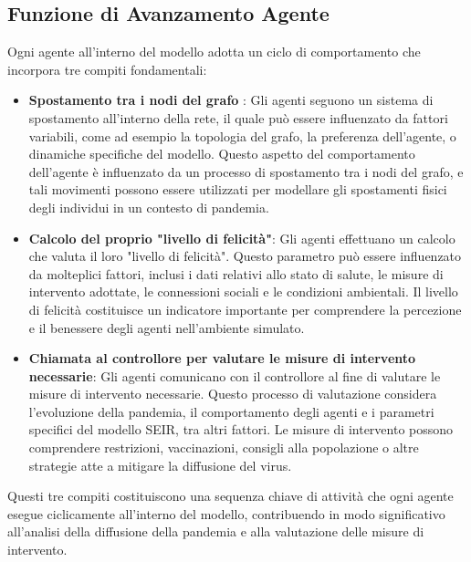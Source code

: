 \newpage

\subsection{Funzione di Avanzamento Agente}

Ogni agente all'interno del modello adotta un ciclo di comportamento che 
incorpora tre compiti fondamentali:

\begin{itemize}
	\item \textbf{Spostamento tra i nodi del grafo} \cite{Ding2021}: 
	Gli agenti seguono un sistema di spostamento all'interno della rete, 
	il quale può essere influenzato da fattori variabili, 
	come ad esempio la topologia del grafo, la preferenza dell'agente, 
	o dinamiche specifiche del modello. Questo aspetto del 
	comportamento dell'agente è influenzato da un processo di 
	spostamento tra i nodi del grafo, e tali movimenti possono essere 
	utilizzati per modellare gli spostamenti fisici degli individui in 
	un contesto di pandemia.
	\item \textbf{Calcolo del proprio "livello di felicità"}: Gli agenti 
	effettuano un calcolo che valuta il loro "livello di felicità". 
	Questo parametro può essere influenzato da molteplici fattori, 
	inclusi i dati relativi allo stato di salute, le misure di 
	intervento adottate, le connessioni sociali e le condizioni 
	ambientali. Il livello di felicità costituisce un indicatore 
	importante per comprendere la percezione e il benessere degli 
	agenti nell'ambiente simulato.
	\item \textbf{Chiamata al controllore per valutare le misure 
	di intervento necessarie}: Gli agenti comunicano con il controllore 
	al fine di valutare le misure di intervento necessarie. 
	Questo processo di valutazione considera l'evoluzione della pandemia, 
	il comportamento degli agenti e i parametri specifici del modello SEIR, 
	tra altri fattori. Le misure di intervento possono comprendere 
	restrizioni, vaccinazioni, consigli alla popolazione o altre 
	strategie atte a mitigare la diffusione del virus.
\end{itemize}

Questi tre compiti costituiscono una sequenza chiave di attività che 
ogni agente esegue ciclicamente all'interno del modello, contribuendo 
in modo significativo all'analisi della diffusione della pandemia e 
alla valutazione delle misure di intervento.


